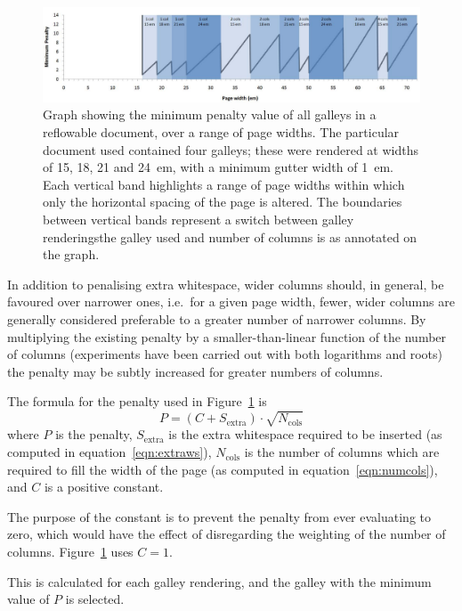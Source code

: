 \begin{figure}
 \includegraphics[width=\textwidth]{gfx/graph-em}
 \caption[Graph of minimum penalty values]{Graph showing the minimum penalty value of all galleys in a reflowable document, over a range of page widths. The particular document used contained four galleys; these were rendered at widths of 15, 18, 21 and 24~em, with a minimum gutter width of 1~em. Each vertical band highlights a range of page widths within which only the horizontal spacing of the page is altered. The boundaries between vertical bands represent a switch between galley renderings\ed{}the galley used and number of columns is as annotated on the graph.}
 \label{fig:penaltygraph}
\end{figure}

In addition to penalising extra whitespace, wider columns should, in general, be favoured over narrower ones, i.e.~for a given page width, fewer, wider columns are generally considered preferable to a greater number of narrower columns. By multiplying the existing penalty by a smaller-than-linear function of the number of columns (experiments have been carried out with both logarithms and roots) the penalty may be subtly increased for greater numbers of columns.

The formula for the penalty used in Figure~\ref{fig:penaltygraph} is \begin{equation}P = (C + S_\text{extra})\cdot\sqrt{N_\text{cols}}\end{equation} where $P$ is the penalty, $S_\text{extra}$ is the extra whitespace required to be inserted (as computed in equation~\ref{eqn:extraws}), $N_\text{cols}$ is the number of columns which are required to fill the width of the page (as computed in equation~\ref{eqn:numcols}), and $C$ is a positive constant.

The purpose of the constant is to prevent the penalty from ever evaluating to zero, which would have the effect of disregarding the weighting of the number of columns. Figure~\ref{fig:penaltygraph} uses $C=1$.

This is calculated for each galley rendering, and the galley with the minimum value of $P$ is selected.


